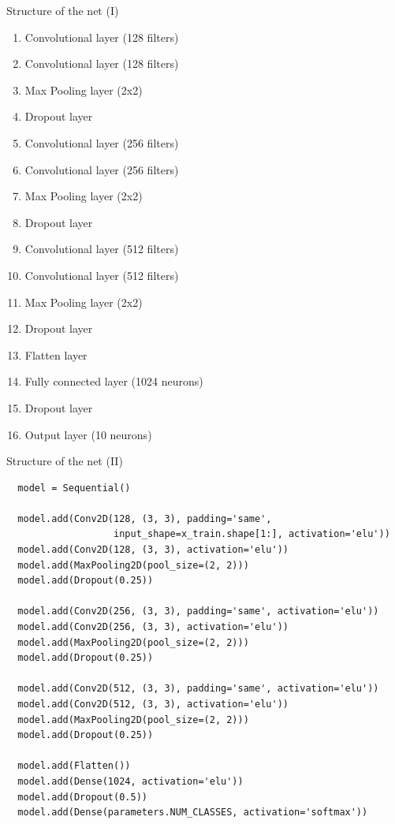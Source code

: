 \documentclass{beamer}
\begin{document}
\begin{frame}[fragile]{Structure of the net (I)}
 \begin{multicols}{2}

  \begin{enumerate}
   \item<+-> Convolutional layer (128 filters)
   \item<+-> Convolutional layer (128 filters)
   \item<+-> Max Pooling layer (2x2)
   \item<+-> Dropout layer
   \item<+-> Convolutional layer (256 filters)
   \item<+-> Convolutional layer (256 filters)
   \item<+-> Max Pooling layer (2x2)
   \item<+-> Dropout layer
   \item<+-> Convolutional layer (512 filters)
   \item<+-> Convolutional layer (512 filters)
   \item<+-> Max Pooling layer (2x2)
   \item<+-> Dropout layer
   \item<+-> Flatten layer
   \item<+-> Fully connected layer (1024 neurons)
   \item<+-> Dropout layer
   \item<+-> Output layer (10 neurons)
  \end{enumerate}
 \end{multicols}


\end{frame}

\begin{frame}[fragile]{Structure of the net (II)}
 \begin{verbatim}
  model = Sequential()

  model.add(Conv2D(128, (3, 3), padding='same',
                   input_shape=x_train.shape[1:], activation='elu'))
  model.add(Conv2D(128, (3, 3), activation='elu'))
  model.add(MaxPooling2D(pool_size=(2, 2)))
  model.add(Dropout(0.25))

  model.add(Conv2D(256, (3, 3), padding='same', activation='elu'))
  model.add(Conv2D(256, (3, 3), activation='elu'))
  model.add(MaxPooling2D(pool_size=(2, 2)))
  model.add(Dropout(0.25))

  model.add(Conv2D(512, (3, 3), padding='same', activation='elu'))
  model.add(Conv2D(512, (3, 3), activation='elu'))
  model.add(MaxPooling2D(pool_size=(2, 2)))
  model.add(Dropout(0.25))

  model.add(Flatten())
  model.add(Dense(1024, activation='elu'))
  model.add(Dropout(0.5))
  model.add(Dense(parameters.NUM_CLASSES, activation='softmax'))

  \end{verbatim}
\end{frame}
\end{document}
